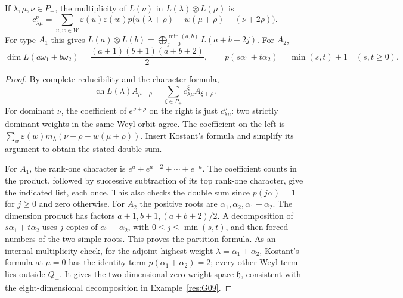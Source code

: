 \begin{theorem}
\label{res:H09}
If \(\lambda,\mu,\nu\in P_+\), the multiplicity of \(L(\nu)\)
in \(L(\lambda)\otimes L(\mu)\) is
\[
 c_{\lambda\mu}^{\nu}
 =\sum_{u,w\in W}\varepsilon(u)\varepsilon(w)
   p\bigl(u(\lambda+\rho)+w(\mu+\rho)-(\nu+2\rho)\bigr).
\]
For type \(A_1\) this gives
\(L(a)\otimes L(b)=\bigoplus_{j=0}^{\min(a,b)}L(a+b-2j)\).
For \(A_2\),
\[
 \dim L(a\omega_1+b\omega_2)
    =\frac{(a+1)(b+1)(a+b+2)}2 ,
 \qquad p(s\alpha_1+t\alpha_2)=
      \min(s,t)+1\quad(s,t\geq0).
\]
\end{theorem}
\begin{proof}
By complete reducibility and the character formula,
\[
 \operatorname{ch}L(\lambda) A_{\mu+\rho}
       =\sum_{\xi\in P_+}c_{\lambda\mu}^{\xi}A_{\xi+\rho}.
\]
For dominant \(\nu\), the coefficient of \(e^{\nu+\rho}\)
on the right is just \(c_{\lambda\mu}^\nu\):
two strictly dominant weights in the same Weyl orbit agree.
The coefficient on the left is
\(\sum_w\varepsilon(w)m_\lambda(\nu+\rho-w(\mu+\rho))\).
Insert Kostant's formula and simplify its argument to obtain
the stated double sum.

For \(A_1\), the rank-one character is
\(e^a+e^{a-2}+\cdots+e^{-a}\).
The coefficient counts in the product, followed by successive
subtraction of its top rank-one character, give the indicated
list, each once. This also checks the double sum since
\(p(j\alpha)=1\) for \(j\geq0\) and zero otherwise.
For \(A_2\) the positive roots are
\(\alpha_1,\alpha_2,\alpha_1+\alpha_2\).
The dimension product has factors
\(a+1,b+1,(a+b+2)/2\).
A decomposition of \(s\alpha_1+t\alpha_2\) uses
\(j\) copies of \(\alpha_1+\alpha_2\), with
\(0\leq j\leq\min(s,t)\), and then forced numbers of the
two simple roots. This proves the partition formula.
As an internal multiplicity check, for the adjoint highest
weight \(\lambda=\alpha_1+\alpha_2\), Kostant's formula at
\(\mu=0\) has the identity term \(p(\alpha_1+\alpha_2)=2\);
every other Weyl term lies outside \(Q_+\).
It gives the two-dimensional zero weight space \(\mathfrak h\),
consistent with the eight-dimensional decomposition in
Example~\ref{res:G09}.
\end{proof}
